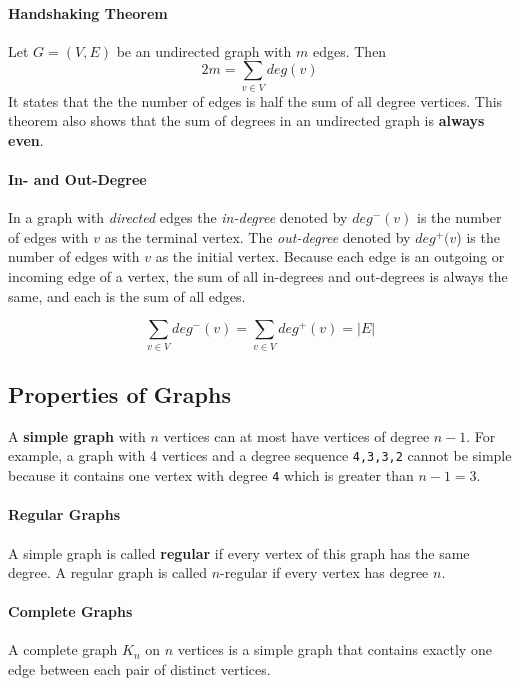 \paragraph{Handshaking Theorem} Let \( G = (V,E) \) be an undirected graph with \( m \) edges. Then
\[
2m = \sum_{v \in V} deg(v)	
\]
It states that the the number of edges is half the sum of all degree vertices. This theorem also shows that the sum of degrees in an undirected graph is \textbf{always even}. 

\paragraph{In- and Out-Degree} In a graph with \emph{directed} edges the \emph{in-degree} denoted by \( deg^-(v) \) is the number of edges with \( v \) as the terminal vertex. The \emph{out-degree} denoted by \(deg^+( v \)) is the number of edges with \( v \) as the initial vertex. Because each edge is an outgoing or incoming edge of a vertex, the sum of all in-degrees and out-degrees is always the same, and each is the sum of all edges.

\[
	\sum_{v \in V} deg^-(v) = \sum_{v \in V} deg^+(v) = |E|
\]

\subsection{Properties of Graphs}

A \textbf{simple graph} with \( n \) vertices can at most have vertices of degree \( n-1 \). For example, a graph with 4 vertices and a degree sequence \texttt{4,3,3,2} cannot be simple because it contains one vertex with degree \texttt{4} which is greater than \( n-1 = 3 \).

\paragraph{Regular Graphs} A simple graph is called \textbf{regular} if every vertex of this graph has the same degree. A regular graph is called \( n \)-regular if every vertex has degree \( n \).

\paragraph{Complete Graphs} A complete graph \( K_n \) on \( n \) vertices is a simple graph that contains exactly one edge between each pair of distinct vertices.

